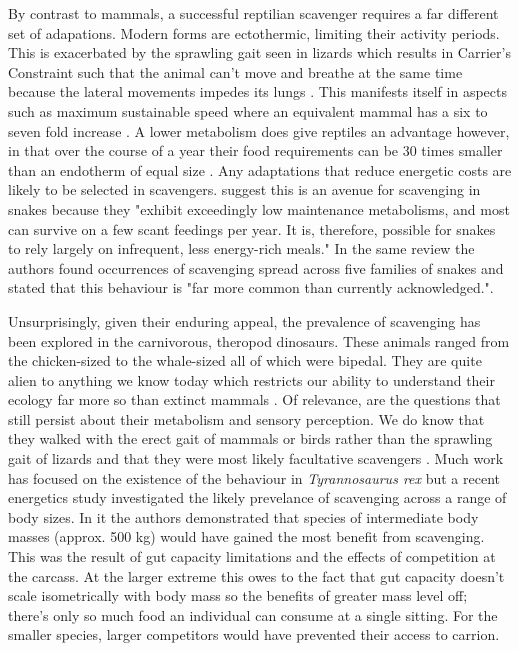 \documentclass[a4paper,12pt]{article}
\begin{document}
By contrast to mammals, a successful reptilian scavenger requires a far different set of adapations. Modern forms are ectothermic, limiting their activity periods. This is exacerbated by the sprawling gait seen in lizards which results in Carrier's Constraint such that the animal can't move and breathe at the same time because the lateral movements impedes its lungs \citep{carrier1987evolution}. This manifests itself in aspects such as maximum sustainable speed where an equivalent mammal has a six to seven fold increase \citep{ruben1995evolution}. A lower metabolism does give reptiles an advantage however, in that over the course of a year their food requirements can be 30 times smaller than an endotherm of equal size \citep{Nagy1621}. Any adaptations that reduce energetic costs are likely to be selected in scavengers. \cite{devault2002scavenging} suggest this is an avenue for scavenging in snakes because they "exhibit  exceedingly  low  maintenance  metabolisms,  and most  can  survive  on  a  few  scant  feedings per year. It  is, therefore, possible for snakes to rely largely  on  infrequent,  less  energy-rich  meals." In the same review the authors found occurrences of scavenging spread across five families of snakes and stated that this behaviour is "far more common than currently acknowledged."\citep{devault2002scavenging}. 

Unsurprisingly, given their enduring appeal, the prevalence of scavenging has been explored in the carnivorous, theropod dinosaurs. These animals ranged from the chicken-sized to the whale-sized all of which were bipedal. They are quite alien to anything we know today which restricts our ability to understand their ecology far more so than extinct mammals \citep{weishampel2004dinosauria}. Of relevance, are the questions that still persist about their metabolism \citep{grady2014evidence} and sensory perception. We do know that they walked with the erect gait of mammals or birds rather than the sprawling gait of lizards and that they were most likely facultative scavengers \citep{depalma2013physical}. Much work has focused on the existence of the behaviour in \textit{Tyrannosaurus rex} \citep{ruxton2003could,carbone2011intra} but a recent energetics study investigated the likely prevelance of scavenging across a range of body sizes. In it the authors demonstrated that species of intermediate body masses (approx. 500 kg) would have gained the most benefit from scavenging. This was the result of gut capacity limitations and the effects of competition at the carcass. At the larger extreme this owes to the fact that gut capacity doesn't scale isometrically with body mass so the benefits of greater mass level off; there's only so much food an individual can consume at a single sitting. For the smaller species, larger competitors would have prevented their access to carrion. 
\end{document}
